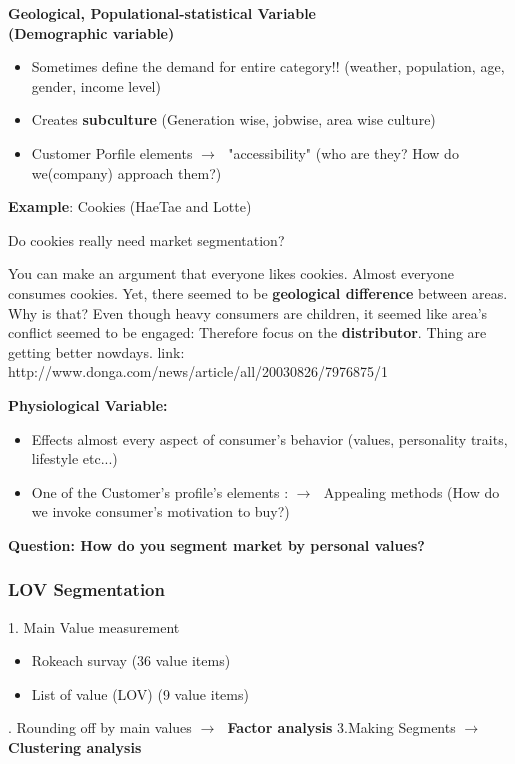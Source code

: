 \documentclass[12pt]{article}
\newcommand{\ra}{$\rightarrow \text{ }$}
\newcommand{\nii}{\noindent}
\begin{document}
\textbf{Geological, Populational-statistical Variable \\ (Demographic variable)}

\begin{itemize}
	\item Sometimes define the demand for entire category!! (weather, population, age, gender, income level)
	\item Creates \textbf{subculture} (Generation wise, jobwise, area wise culture)
	\item Customer Porfile elements \ra "accessibility" (who are they? How do we(company) approach them?)
\end{itemize}

\begin{tcolorbox}
	\textbf{Example}: Cookies (HaeTae and Lotte)
	\begin{center}
		Do cookies really need market segmentation?
	\end{center}
	You can make an argument that everyone likes cookies. Almost everyone consumes cookies. Yet, there seemed to be \textbf{geological difference} between areas. Why is that? Even though heavy consumers are children, it seemed like area's conflict seemed to be engaged: Therefore focus on the \textbf{distributor}. Thing are getting better nowdays. link:
	http://www.donga.com/news/article/all/20030826/7976875/1

\end{tcolorbox}

\textbf{Physiological Variable:}
\begin{itemize}
	\item Effects almost every aspect of consumer's behavior (values, personality traits, lifestyle etc...)
	\item One of the Customer's profile's elements : \ra Appealing methods (How do we invoke consumer's motivation to buy?)
\end{itemize}
\textbf{Question: How do you segment market by personal values?}

\subsubsection{LOV Segmentation}

1. Main Value measurement
\begin{itemize}
	\item  Rokeach survay (36 value items)
	\item List of value (LOV) (9 value items)

\end{itemize}
\nii
2. Rounding off by main values \ra \textbf{Factor analysis}
\nii
3.Making Segments \ra \textbf{Clustering analysis}
\end{document}
